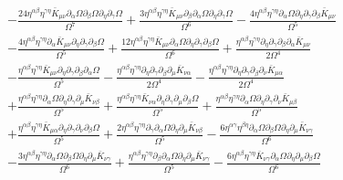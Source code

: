 \documentclass[10pt,letterpaper]{article}
\begin{document}
\begin{align}
&-  \frac{24 \eta^{\alpha \beta} \eta^{\gamma \eta} \bar{K}_{\mu \nu} \partial_{\alpha}\Omega \partial_{\beta}\Omega \partial_{\eta}\partial_{\gamma}\Omega}{\Omega^7} + \frac{3 \eta^{\alpha \beta} \eta^{\gamma \eta} \bar{K}_{\mu \nu} \partial_{\beta}\partial_{\alpha}\Omega \partial_{\eta}\partial_{\gamma}\Omega}{\Omega^6} -  \frac{4 \eta^{\alpha \beta} \eta^{\gamma \eta} \partial_{\alpha}\Omega \partial_{\eta}\partial_{\gamma}\partial_{\beta}\bar{K}_{\mu \nu}}{\Omega^5}\nonumber \\
& -  \frac{4 \eta^{\alpha \beta} \eta^{\gamma \eta} \partial_{\alpha}\bar{K}_{\mu \nu} \partial_{\eta}\partial_{\gamma}\partial_{\beta}\Omega}{\Omega^5} + \frac{12 \eta^{\alpha \beta} \eta^{\gamma \eta} \bar{K}_{\mu \nu} \partial_{\alpha}\Omega \partial_{\eta}\partial_{\gamma}\partial_{\beta}\Omega}{\Omega^6} + \frac{\eta^{\alpha \beta} \eta^{\gamma \eta} \partial_{\eta}\partial_{\gamma}\partial_{\beta}\partial_{\alpha}\bar{K}_{\mu \nu}}{2 \Omega^4}\nonumber \\
& -  \frac{\eta^{\alpha \beta} \eta^{\gamma \eta} \bar{K}_{\mu \nu} \partial_{\eta}\partial_{\gamma}\partial_{\beta}\partial_{\alpha}\Omega}{\Omega^5} -  \frac{\eta^{\alpha \beta} \eta^{\gamma \eta} \partial_{\eta}\partial_{\gamma}\partial_{\beta}\partial_{\mu}\bar{K}_{\nu \alpha}}{2 \Omega^4} -  \frac{\eta^{\alpha \beta} \eta^{\gamma \eta} \partial_{\eta}\partial_{\gamma}\partial_{\beta}\partial_{\nu}\bar{K}_{\mu \alpha}}{2 \Omega^4} \nonumber \\
&+ \frac{\eta^{\alpha \beta} \eta^{\gamma \eta} \partial_{\alpha}\Omega \partial_{\eta}\partial_{\gamma}\partial_{\mu}\bar{K}_{\nu \beta}}{\Omega^5} + \frac{\eta^{\alpha \beta} \eta^{\gamma \eta} \bar{K}_{\nu \alpha} \partial_{\eta}\partial_{\gamma}\partial_{\mu}\partial_{\beta}\Omega}{\Omega^5} + \frac{\eta^{\alpha \beta} \eta^{\gamma \eta} \partial_{\alpha}\Omega \partial_{\eta}\partial_{\gamma}\partial_{\nu}\bar{K}_{\mu \beta}}{\Omega^5} \nonumber \\
&+ \frac{\eta^{\alpha \beta} \eta^{\gamma \eta} \bar{K}_{\mu \alpha} \partial_{\eta}\partial_{\gamma}\partial_{\nu}\partial_{\beta}\Omega}{\Omega^5} + \frac{2 \eta^{\alpha \beta} \eta^{\gamma \eta} \partial_{\gamma}\partial_{\alpha}\Omega \partial_{\eta}\partial_{\mu}\bar{K}_{\nu \beta}}{\Omega^5} -  \frac{6 \eta^{\alpha \gamma} \eta^{\beta \eta} \partial_{\alpha}\Omega \partial_{\beta}\Omega \partial_{\eta}\partial_{\mu}\bar{K}_{\nu \gamma}}{\Omega^6} \nonumber \\
&-  \frac{3 \eta^{\alpha \beta} \eta^{\gamma \eta} \partial_{\alpha}\Omega \partial_{\beta}\Omega \partial_{\eta}\partial_{\mu}\bar{K}_{\nu \gamma}}{\Omega^6} + \frac{\eta^{\alpha \beta} \eta^{\gamma \eta} \partial_{\beta}\partial_{\alpha}\Omega \partial_{\eta}\partial_{\mu}\bar{K}_{\nu \gamma}}{\Omega^5} -  \frac{6 \eta^{\alpha \beta} \eta^{\gamma \eta} \bar{K}_{\nu \gamma} \partial_{\alpha}\Omega \partial_{\eta}\partial_{\mu}\partial_{\beta}\Omega}{\Omega^6}\nonumber \\

\end{align}
\end{document}

